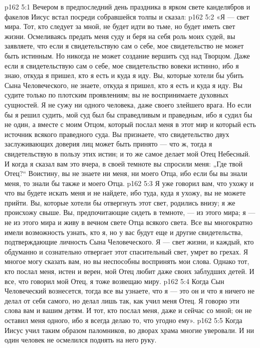 \vs p162 5:1 Вечером в предпоследний день праздника в ярком свете канделябров и факелов Иисус встал посреди собравшейся толпы и сказал:
\vs p162 5:2 \pc «Я --- свет мира. Тот, кто следует за мной, не будет идти во тьме, но будет иметь свет жизни. Осмеливаясь предать меня суду и беря на себя роль моих судей, вы заявляете, что если я свидетельствую сам о себе, мое свидетельство не может быть истинным. Но никогда не может создание вершить суд над Творцом. Даже если я свидетельствую сам о себе, мое свидетельство вовеки истинно, ибо я знаю, откуда я пришел, кто я есть и куда я иду. Вы, которые хотели бы убить Сына Человеческого, не знаете, откуда я пришел, кто я есть и куда я иду. Вы судите только по плотским проявлениям; вы не воспринимаете духовных сущностей. Я не сужу ни одного человека, даже своего злейшего врага. Но если бы я решил судить, мой суд был бы справедливым и праведным, ибо я судил бы не один, а вместе с моим Отцом, который послал меня в этот мир и который есть источник всякого праведного суда. Вы признаете, что свидетельство двух заслуживающих доверия лиц может быть принято --- что ж, тогда я свидетельствую в пользу этих истин; и то же самое делает мой Отец Небесный. И когда я сказал вам это вчера, в своей темноте вы спросили меня: „Где твой Отец?“ Воистину, вы не знаете ни меня, ни моего Отца, ибо если бы вы знали меня, то знали бы также и моего Отца.
\vs p162 5:3 Я уже говорил вам, что ухожу и что вы будете искать меня и не найдете, ибо туда, куда я ухожу, вы не можете прийти. Вы, которые хотели бы отвергнуть этот свет, родились внизу; я же происхожу свыше. Вы, предпочитающие сидеть в темноте, --- из этого мира; я --- не из этого мира и живу в вечном свете Отца всякого света. Все вы многократно имели возможность узнать, кто я, но у вас будут еще и другие свидетельства, подтверждающие личность Сына Человеческого. Я --- свет жизни, и каждый, кто обдуманно и сознательно отвергает этот спасительный свет, умрет во грехах. Я многое могу сказать вам, но вы неспособны воспринять мои слова. Однако тот, кто послал меня, истен и верен, мой Отец любит даже своих заблудших детей. И все, что говорил мой Отец, я тоже возвещаю миру.
\vs p162 5:4 Когда Сын Человеческий вознесется, тогда все вы узнаете, что я --- это он и что я ничего не делал от себя самого, но делал лишь так, как учил меня Отец. Я говорю эти слова вам и вашим детям. И тот, кто послал меня, даже и сейчас со мной; он не оставил меня одного, ибо я всегда делаю то, что угодно ему».
\vs p162 5:5 \pc Когда Иисус учил таким образом паломников, во дворах храма многие уверовали. И ни один человек не осмелился поднять на него руку.
